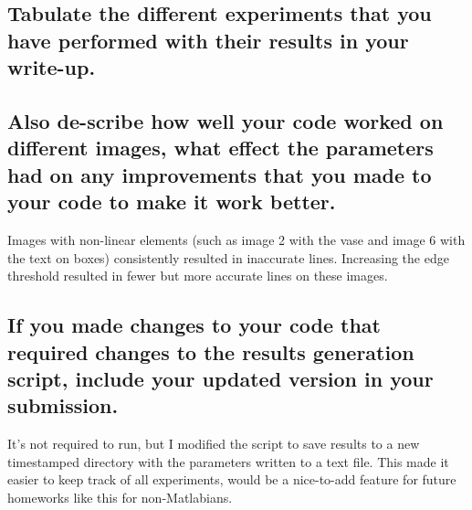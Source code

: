 \documentclass[12pt]{article}
\begin{document}
\subsection{Tabulate the different experiments that you have performed with their results in your write-up.}

\subsection{Also de-scribe how well your code worked on different images, what effect the parameters had on any improvements that you made to your code to make it work better. }
Images with non-linear elements (such as image 2 with the vase and image 6 with the text on boxes) consistently resulted in inaccurate lines. Increasing the edge threshold resulted in fewer but more accurate lines on these images.

\subsection{If you made changes to your code that required changes to the results generation script, include your updated version in your submission.  }
It's not required to run, but I modified the script to save results to a new timestamped directory with the parameters written to a text file. This made it easier to keep track of all experiments, would be a nice-to-add feature for future homeworks like this for non-Matlabians.
\end{document}
